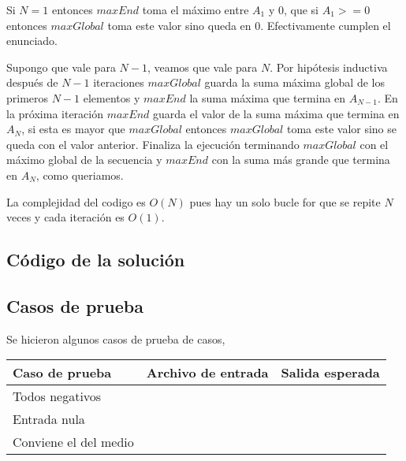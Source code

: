 	Si $N=1$ entonces  $maxEnd$ toma el m\'aximo entre $A_1$ y $0$, que si
	$A_1>=0$ entonces $maxGlobal$ toma este valor sino queda en $0$. 
	Efectivamente cumplen el enunciado.
	
	
	Supongo que vale para $N-1$, veamos que vale para $N$.
	Por hip\'otesis inductiva despu\'es de $N-1$ iteraciones $maxGlobal$
	guarda la suma m\'axima global de los primeros $N-1$ elementos y 
	$maxEnd$ la suma m\'axima que termina en $A_{N-1}$. En la pr\'oxima 
	iteraci\'on $maxEnd$ guarda el valor de la suma m\'axima que termina 
	en $A_N$, si esta es mayor que $maxGlobal$ entonces $maxGlobal$ toma 
	este valor sino se queda con el valor anterior. Finaliza la 
	ejecuci\'on terminando $maxGlobal$ con el m\'aximo global de la 
	secuencia y $maxEnd$ con la suma m\'as grande que termina en 
	$A_N$, como queriamos.


La complejidad del codigo es $O(N)$ pues hay un solo bucle for que se
repite $N$ veces y cada iteraci\'on es $O(1)$.
\subsection{C\'odigo de la soluci\'on}


\subsection{Casos de prueba}

Se hicieron algunos casos de prueba de casos,

\begin{flushleft}
\begin{tabulary}{\textwidth}{@{}|L|L|L|@{}}
\hline
\textbf{Caso de prueba} & \textbf{Archivo de entrada} & \textbf{Salida esperada} \\
\hline
Todos negativos &  &  \\ \hline
Entrada nula &  &  \\ \hline
Conviene el del medio &  &  \\ \hline
\end{tabulary}
\end{flushleft}
